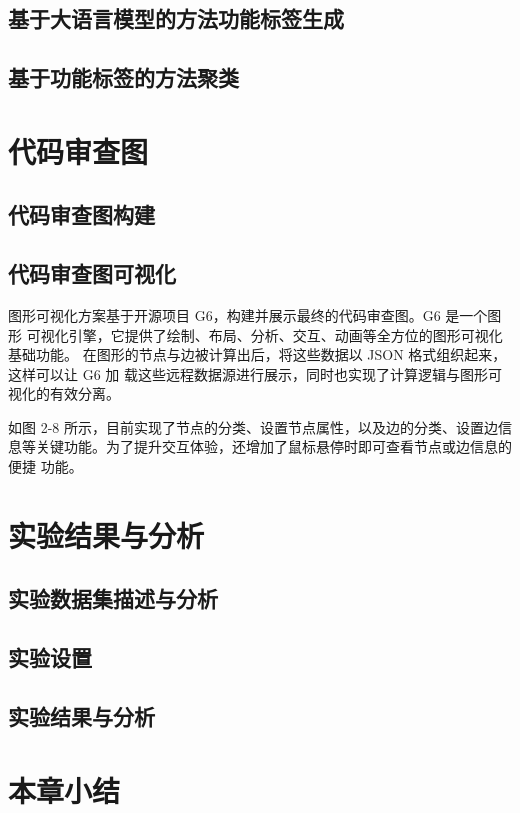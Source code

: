 \subsection{基于大语言模型的方法功能标签生成}
\subsection{基于功能标签的方法聚类}

\section{代码审查图}
\subsection{代码审查图构建}
\subsection{代码审查图可视化}

图形可视化方案基于开源项目 G6，构建并展示最终的代码审查图。G6 是一个图形
可视化引擎，它提供了绘制、布局、分析、交互、动画等全方位的图形可视化基础功能。
在图形的节点与边被计算出后，将这些数据以 JSON 格式组织起来，这样可以让 G6 加
载这些远程数据源进行展示，同时也实现了计算逻辑与图形可视化的有效分离。


如图 2-8 所示，目前实现了节点的分类、设置节点属性，以及边的分类、设置边信
息等关键功能。为了提升交互体验，还增加了鼠标悬停时即可查看节点或边信息的便捷
功能。

\section{实验结果与分析}

\subsection{实验数据集描述与分析}
\subsection{实验设置}
\subsection{实验结果与分析}

\section{本章小结}





